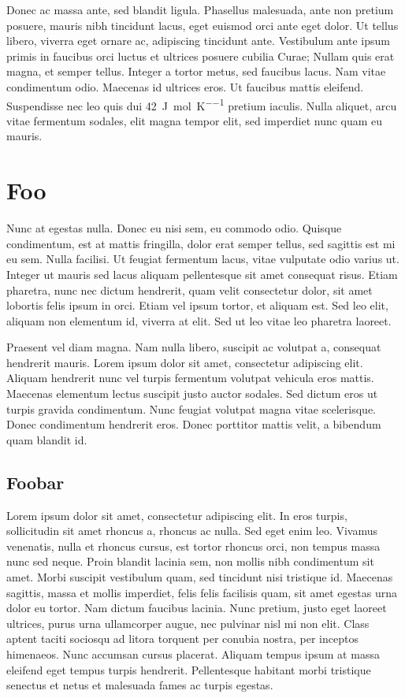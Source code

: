 \documentclass[a4paper, 12pt]{article}
\begin{document}
Donec ac massa ante, sed blandit ligula. Phasellus malesuada, ante non pretium posuere, mauris nibh tincidunt lacus, eget euismod orci ante eget dolor. Ut tellus libero, viverra eget ornare ac, adipiscing tincidunt ante. Vestibulum ante ipsum primis in faucibus orci luctus et ultrices posuere cubilia Curae; Nullam quis erat magna, et semper tellus. Integer a tortor metus, sed faucibus lacus. Nam vitae condimentum odio. Maecenas id ultrices eros. Ut faucibus mattis eleifend. Suspendisse nec leo quis dui \SI{42}{\joule\per\mole\per\kelvin} pretium iaculis. Nulla aliquet, arcu vitae fermentum sodales, elit magna tempor elit, sed imperdiet nunc quam eu mauris.


\clearpage
\section{Foo}
\label{section:foo}

Nunc at egestas nulla. Donec eu nisi sem, eu commodo odio. Quisque condimentum, est at mattis fringilla, dolor erat semper tellus, sed sagittis est mi eu sem. Nulla facilisi. Ut feugiat fermentum lacus, vitae vulputate odio varius ut. Integer ut mauris sed lacus aliquam pellentesque sit amet consequat risus. Etiam pharetra, nunc nec dictum hendrerit, quam velit consectetur dolor, sit amet lobortis felis ipsum in orci. Etiam vel ipsum tortor, et aliquam est. Sed leo elit, aliquam non elementum id, viverra at elit. Sed ut leo vitae leo pharetra laoreet.

Praesent vel diam magna. Nam nulla libero, suscipit ac volutpat a, consequat hendrerit mauris. Lorem ipsum dolor sit amet, consectetur adipiscing elit. Aliquam hendrerit nunc vel turpis fermentum volutpat vehicula eros mattis. Maecenas elementum lectus suscipit justo auctor sodales. Sed dictum eros ut turpis gravida condimentum. Nunc feugiat volutpat magna vitae scelerisque. Donec condimentum hendrerit eros. Donec porttitor mattis velit, a bibendum quam blandit id.


\subsection{Foobar}
\label{section:foo:foobar}

Lorem ipsum dolor sit amet, consectetur adipiscing elit. In eros turpis, sollicitudin sit amet rhoncus a, rhoncus ac nulla. Sed eget enim leo. Vivamus venenatis, nulla et rhoncus cursus, est tortor rhoncus orci, non tempus massa nunc sed neque. Proin blandit lacinia sem, non mollis nibh condimentum sit amet. Morbi suscipit vestibulum quam, sed tincidunt nisi tristique id. Maecenas sagittis, massa et mollis imperdiet, felis felis facilisis quam, sit amet egestas urna dolor eu tortor. Nam dictum faucibus lacinia. Nunc pretium, justo eget laoreet ultrices, purus urna ullamcorper augue, nec pulvinar nisl mi non elit. Class aptent taciti sociosqu ad litora torquent per conubia nostra, per inceptos himenaeos. Nunc accumsan cursus placerat. Aliquam tempus ipsum at massa eleifend eget tempus turpis hendrerit. Pellentesque habitant morbi tristique senectus et netus et malesuada fames ac turpis egestas.
\end{document}
